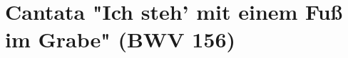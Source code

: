 \section*{Cantata "Ich steh' mit einem Fu{\ss} im Grabe" (BWV 156)}
{%
\parindent 0pt
\noindent
\ifx\preLilyPondExample \undefined
\else
  \expandafter\preLilyPondExample
\fi
\def\lilypondbook{}%

\ifx\postLilyPondExample \undefined
\else
  \expandafter\postLilyPondExample
\fi
}
